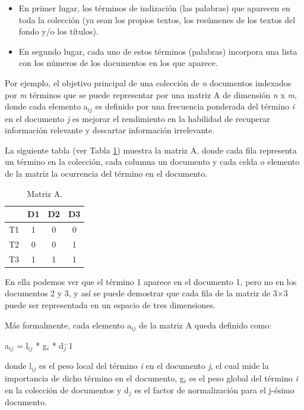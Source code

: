 \documentclass{article}
\begin{document}
\begin{itemize}
	\item En primer lugar, los términos de indización (las palabras) que aparecen en toda la colección (ya sean los propios textos, los resúmenes de los textos del fondo y/o los títulos).
	\item En segundo lugar, cada uno de estos términos (palabras) incorpora una lista con los números de los documentos en los que aparece.
\end{itemize}

Por ejemplo, el objetivo principal de una colección de \textit{n} documentos indexados por \textit{m} términos que se puede representar por una matriz A de dimensión \textit{n} x \textit{m}, donde cada elemento a$_{ij}$ es definido por una frecuencia ponderada del término \textit{i} en el documento \textit{j} es mejorar el rendimiento en la habilidad de recuperar información relevante y descartar información irrelevante. 

La siguiente tabla (ver Tabla \ref{fig: Table 1}) muestra la matriz A, donde cada fila representa un término en la colección, cada columna un documento y cada celda o elemento de la matriz la ocurrencia del término en el documento.

\begin{table}[h]
	\begin{center}
		\begin{tabular}{ |c|c|c|c| }
			\hline 
			& D1 & D2 & D3 \\
			\hline
			T1 & 1 & 0 & 0 \\ 
			\hline
			T2 & 0 & 0	& 1 \\ 
			\hline
			T3 & 1 & 1	& 1 \\
			\hline
		\end{tabular}
		\caption{Matriz A.}
		\label{fig: Table 1}
	\end{center}
\end{table}

En ella podemos ver que el término 1 aparece en el documento 1, pero no en los documentos 2 y 3, y así se puede demostrar que cada fila de la matriz de 3×3 puede ser representada en un espacio de tres dimensiones.

Más formalmente, cada elemento a$_{ij}$ de la matriz A queda definido como: 

\begin{center}
	a$_{ij}$ = l$_{ij}$ * g$_{i}$ * d$_{j}^-1$
\end{center}

donde l$_{ij}$ es el peso local del término \textit{i} en el documento \textit{j}, el cual mide la importancia de dicho término en el documento, g$_{i}$ es el peso global del término \textit{i} en la colección de documentos y d$_{j}$ es el factor de normalización para el j-ésimo documento. 
\end{document}
